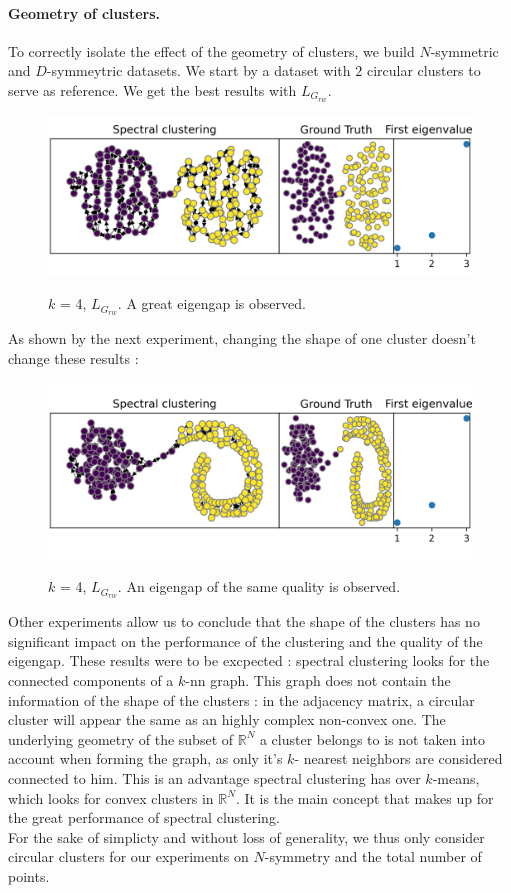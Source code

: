 \documentclass[a4paper,12pt]{article}
\theoremstyle{definition}
\theoremstyle{plain}
\def\R{\mathbb{R}}%
\begin{document}
\paragraph{Geometry of clusters.}
To correctly isolate the effect of the geometry of clusters, we build $N$-symmetric and $D$-symmeytric datasets. We start by a dataset with $2$ circular clusters to serve as reference.
We get the best results with $L_{G_{rw}}$.
\begin{figure}[H]
	\centering
	\includegraphics[width=0.6\linewidth]{figures/base_circles_g_rw}
	\label{fig:base_circles}
	\caption{$k$ = 4, $L_{G_{rw}}$. A great eigengap is observed.}
\end{figure}
As shown by the next experiment, changing the shape of one cluster doesn't change these results :
\begin{figure}[H]
	\centering
	\includegraphics[width=0.6\linewidth]{figures/uneven_blobs_g_rw}
	\label{fig:uneven_blobs}
	\caption{$k$ = 4, $L_{G_{rw}}$. An eigengap of the same quality is observed.}
\end{figure}

Other experiments allow us to conclude that the shape of the clusters has no significant impact on the performance of the clustering and the quality of the eigengap.
These results were to be excpected : spectral clustering looks for the connected components of a $k$-nn graph. This graph does not contain the information of the shape of the clusters : in the adjacency matrix, a circular cluster will appear the same as an highly complex non-convex one. The underlying geometry of the subset of $\R^N$ a cluster belongs to is not taken into account when forming the graph, as only it's $k$- nearest neighbors are considered connected to him. This is an advantage spectral clustering has over $k$-means, which looks for convex clusters in $\R^N$. It is the main concept that makes up for the great performance of spectral clustering. \\
For the sake of simplicty and without loss of generality, we thus only consider circular clusters for our experiments on $N$-symmetry and the total number of points.
\end{document}
